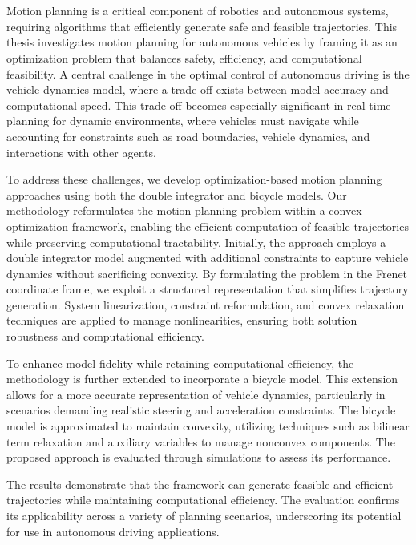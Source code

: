 \chapter{\abstractname}
Motion planning is a critical component of robotics and autonomous systems, requiring algorithms that efficiently generate safe and feasible
trajectories.
This thesis investigates motion planning for autonomous vehicles by framing it as an optimization problem that balances safety, efficiency, and
computational feasibility.
A central challenge in the optimal control of autonomous driving is the vehicle dynamics model, where a trade-off exists between model accuracy and
computational speed.
This trade-off becomes especially significant in real-time planning for dynamic environments, where vehicles must navigate while accounting for
constraints such as road boundaries, vehicle dynamics, and interactions with other agents.

To address these challenges, we develop optimization-based motion planning approaches using both the double integrator and bicycle models.
Our methodology reformulates the motion planning problem within a convex optimization framework, enabling the efficient computation of feasible
trajectories while preserving computational tractability.
Initially, the approach employs a double integrator model augmented with additional constraints to capture vehicle dynamics without sacrificing
convexity.
By formulating the problem in the Frenet coordinate frame, we exploit a structured representation that simplifies trajectory generation.
System linearization, constraint reformulation, and convex relaxation techniques are applied to manage nonlinearities, ensuring both solution
robustness and computational efficiency.

To enhance model fidelity while retaining computational efficiency, the methodology is further extended to incorporate a bicycle model.
This extension allows for a more accurate representation of vehicle dynamics, particularly in scenarios demanding realistic steering and acceleration
constraints.
The bicycle model is approximated to maintain convexity, utilizing techniques such as bilinear term relaxation and auxiliary variables to manage
nonconvex components.
The proposed approach is evaluated through simulations to assess its performance.

The results demonstrate that the framework can generate feasible and efficient trajectories while maintaining computational efficiency.
The evaluation confirms its applicability across a variety of planning scenarios, underscoring its potential for use in autonomous driving
applications.
